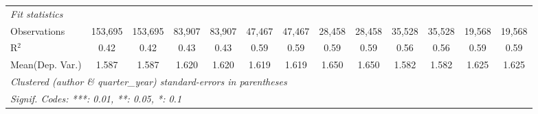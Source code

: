 \begin{tabular}{lcccccccccccc}
   \midrule
   \emph{Fit statistics}\\
   Observations                             & 153,695        & 153,695       & 83,907         & 83,907       & 47,467       & 47,467         & 28,458        & 28,458   & 35,528  & 35,528       & 19,568  & 19,568\\  
   R$^2$                                    & 0.42           & 0.42          & 0.43           & 0.43         & 0.59         & 0.59           & 0.59          & 0.59     & 0.56    & 0.56         & 0.59    & 0.59\\  
Mean(Dep. Var.) & 1.587 & 1.587 & 1.620 & 1.620 & 1.619 & 1.619 & 1.650 & 1.650 & 1.582 & 1.582 & 1.625 & 1.625 \\
   \midrule \midrule
   \multicolumn{13}{l}{\emph{Clustered (author \& quarter\_year) standard-errors in parentheses}}\\
   \multicolumn{13}{l}{\emph{Signif. Codes: ***: 0.01, **: 0.05, *: 0.1}}\\
\end{tabular}
\par\endgroup
